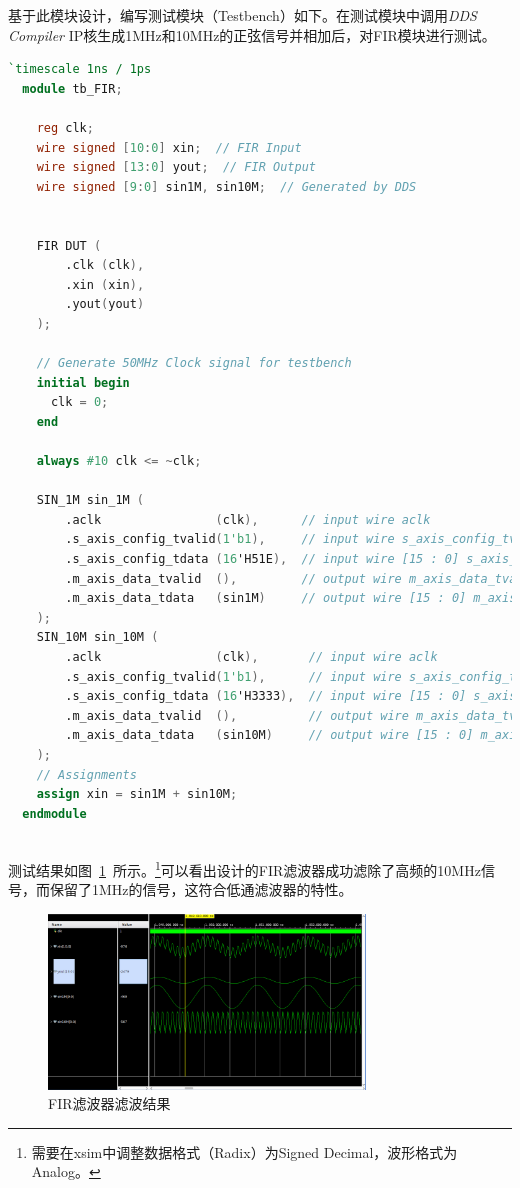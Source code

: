 \documentclass[lang=cn,newtx,10pt,scheme=chinese]{elegantbook}
\begin{document}
基于此模块设计，编写测试模块（Testbench）如下。在测试模块中调用\textit{DDS Compiler} IP核生成1MHz和10MHz的正弦信号并相加后，对FIR模块进行测试。
\begin{lstlisting}[language=verilog, caption={Testbench文件}]
  `timescale 1ns / 1ps
  module tb_FIR;
  
    reg clk;
    wire signed [10:0] xin;  // FIR Input
    wire signed [13:0] yout;  // FIR Output
    wire signed [9:0] sin1M, sin10M;  // Generated by DDS
  
  
    FIR DUT (
        .clk (clk),
        .xin (xin),
        .yout(yout)
    );
  
    // Generate 50MHz Clock signal for testbench
    initial begin
      clk = 0;
    end
  
    always #10 clk <= ~clk;
    
    SIN_1M sin_1M (
        .aclk                (clk),      // input wire aclk
        .s_axis_config_tvalid(1'b1),     // input wire s_axis_config_tvalid
        .s_axis_config_tdata (16'H51E),  // input wire [15 : 0] s_axis_config_tdata
        .m_axis_data_tvalid  (),         // output wire m_axis_data_tvalid
        .m_axis_data_tdata   (sin1M)     // output wire [15 : 0] m_axis_data_tdata
    );
    SIN_10M sin_10M (
        .aclk                (clk),       // input wire aclk
        .s_axis_config_tvalid(1'b1),      // input wire s_axis_config_tvalid
        .s_axis_config_tdata (16'H3333),  // input wire [15 : 0] s_axis_config_tdata
        .m_axis_data_tvalid  (),          // output wire m_axis_data_tvalid
        .m_axis_data_tdata   (sin10M)     // output wire [15 : 0] m_axis_data_tdata
    );
    // Assignments
    assign xin = sin1M + sin10M;
  endmodule
  
\end{lstlisting}

测试结果如图~\ref{fig:exp4:result}~所示。\footnote{需要在xsim中调整数据格式（Radix）为Signed Decimal，波形格式为Analog。}可以看出设计的FIR滤波器成功滤除了高频的10MHz信号，而保留了1MHz的信号，这符合低通滤波器的特性。
\begin{figure}[htbp]
  \centering
  \includegraphics[width=0.75\textwidth]{figure/exp4/vivado_waveform.png}
  \caption{FIR滤波器滤波结果}
  \label{fig:exp4:result}
\end{figure}
\end{document}
